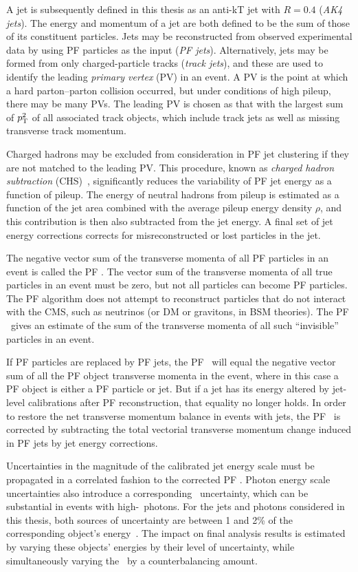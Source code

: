 A jet is subsequently defined in this thesis as an anti-kT jet with $R = 0.4$ (\textit{AK4 jets}). The energy and momentum of a jet are both defined to be the sum of those
of its constituent particles. Jets may be reconstructed from observed experimental data by using PF particles as the input (\textit{PF jets}). Alternatively, jets may be formed
from only charged-particle tracks (\textit{track jets}), and these are used to identify the leading \textit{primary vertex} (PV) in an event. A PV is the point at which a hard parton--parton
collision occurred, but under conditions of high pileup, there may be many PVs. The leading PV is chosen as that with the largest sum of $p_\mathrm{T}^{2}$ of all associated track objects,
which include track jets as well as missing transverse track momentum.

Charged hadrons may be excluded from consideration in PF jet clustering if they are not matched to the leading PV. This procedure, known as \textit{charged hadron subtraction} (CHS)~\cite{ref:CMS-PAS-JME-14-001},
significantly reduces the variability of PF jet energy as a function of pileup. The energy of neutral hadrons from pileup is estimated as a function of
the jet area combined with the average pileup energy density $\rho$, and this contribution is then also subtracted from the jet energy. A final set of jet energy corrections
corrects for misreconstructed or lost particles in the jet.

The negative vector sum of the transverse momenta of all PF particles in an event is called the PF \vecMET. The vector sum of the transverse momenta of
all true particles in an event must be zero, but not all particles can become PF particles. The PF algorithm does not attempt to reconstruct particles that do
not interact with the CMS, such as neutrinos (or DM or gravitons, in BSM theories). The PF \vecMET\ gives an estimate of the sum of the transverse
momenta of all such ``invisible'' particles in an event.

If PF particles are replaced by PF jets, the PF \vecMET\ will equal the negative vector sum of all the PF object transverse momenta in the event, where in this case
a PF object is either a PF particle or jet. But if a jet has its energy altered by jet-level calibrations after PF reconstruction,
that equality no longer holds. In order to restore the net transverse momentum balance in events with jets, the PF \vecMET\ is corrected by subtracting the total vectorial transverse
momentum change induced in PF jets by jet energy corrections.

Uncertainties in the magnitude of the calibrated jet energy scale must be propagated in a correlated
fashion to the corrected PF \vecMET. Photon energy scale uncertainties also introduce a corresponding \vecMET\ uncertainty, which can be substantial in events with high-\pT\ photons.
For the jets and photons considered in this thesis, both sources of uncertainty are between 1 and 2\% of the corresponding object's energy~\cite{ref:1748-0221/12/02/P02014, ref:CMS-DP-2018-028, ref:1748-0221/10/08/P08010}.
The impact on final analysis results is estimated by varying these objects' energies by their level of uncertainty, while simultaneously varying the \vecMET\ by a counterbalancing amount.

